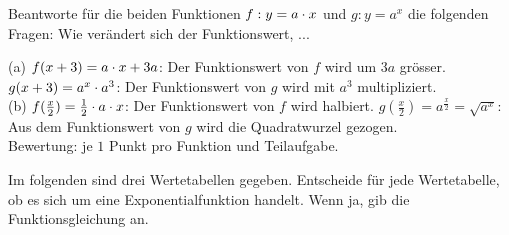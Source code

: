 \documentclass[11pt]{exam}
\begin{document}
\newpage
\begin{questions}
\noaddpoints
\question[\totalpoints]
\addpoints
Beantworte für die beiden Funktionen $f:y=a\cdot x$ und $g:y=a^x$ die folgenden Fragen: Wie verändert sich der Funktionswert, ...
{\begin{solution}
	(a) $f(x+3)=a\cdot x+3a$: Der Funktionswert von $f$ wird um $3a$ grösser. $g(x+3)=a^x\cdot a^3$: Der Funktionswert von $g$ wird mit $a^3$ multipliziert.\\
	(b) $f(\frac{x}{2})=\frac{1}{2}\cdot a\cdot x$: Der Funktionswert von $f$ wird halbiert. $g(\frac{x}{2})=a^{\frac{x}{2}}=\sqrt{a^x}$: Aus dem Funktionswert von $g$ wird die Quadratwurzel gezogen.\\
	Bewertung: je $1$ Punkt pro Funktion und Teilaufgabe.
\end{solution}}
{\vfill}

\question[3]
Im folgenden sind drei Wertetabellen gegeben. Entscheide für jede Wertetabelle, ob es sich um eine Exponentialfunktion handelt. Wenn ja, gib die Funktionsgleichung an.
\end{questions}
\end{document}
